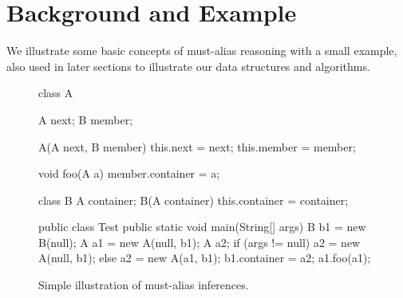 \section{Background and Example}
\label{sec:example}

We illustrate some basic concepts of must-alias reasoning with a small example,
also used in later sections to illustrate our data structures and algorithms.

\begin{figure}[htb!p]
\vspace{-0.4cm}
\begin{minipage}[l]{3in}
\begin{javacode}
class A { 
  A next; 
  B member;

  A(A next, B member) {
    this.next = next;
    this.member = member;
  }

  void foo(A a) {
    member.container = a;
  }
}

class B {
  A container;
  B(A container) { 
    this.container = container; 
  }
}

public class Test {
  public static void main(String[] args) {
    B b1 = new B(null);
    A a1 = new A(null, b1);
    A a2;
    if (args != null) 
      a2 = new A(null, b1);
    else
      a2 = new A(a1, b1);
    b1.container = a2;
    a1.foo(a1);
  }
}
\end{javacode}
\end{minipage}
\caption{Simple illustration of must-alias inferences. }
\label{fig:example}
\end{figure}

